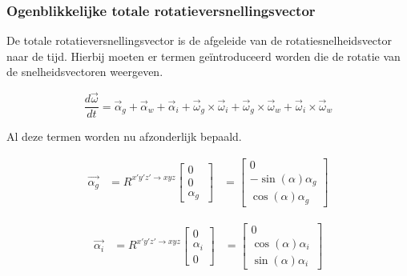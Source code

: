 \subsubsection{Ogenblikkelijke totale rotatieversnellingsvector}
De totale rotatieversnellingsvector is de afgeleide van de rotatiesnelheidsvector naar de tijd. Hierbij moeten er termen ge\"introduceerd worden die de rotatie van de snelheidsvectoren weergeven.

\begin{equation*}
\frac{d\overrightarrow{\omega}}{dt}=\overrightarrow{\alpha}_{g}+\overrightarrow{\alpha}_{w}+\overrightarrow{\alpha}_{i}+\overrightarrow{\omega}_{g}\times\overrightarrow{\omega}_{i}+\overrightarrow{\omega}_{g}\times\overrightarrow{\omega}_{w}+\overrightarrow{\omega}_{i}\times\overrightarrow{\omega}_{w}
\end{equation*}

Al deze termen worden nu afzonderlijk bepaald.

\begin{equation*}
\begin{split}
\overrightarrow{\alpha_{g}}&=R^{x'y'z' \rightarrow xyz}
	\begin{bmatrix}
	0\\
	0\\
	\alpha_{g}\
	\end{bmatrix}
	&=\begin{bmatrix}
	0\\
	-\sin(\alpha)\alpha_{g}\\
	\cos(\alpha)\alpha_{g}\
	\end{bmatrix}
\end{split}
\end{equation*}

\begin{equation*}
\begin{split}
\overrightarrow{\alpha_{i}}&=R^{x'y'z' \rightarrow xyz}
	\begin{bmatrix}
	0\\
	\alpha_{i}\\
	0\
	\end{bmatrix}
	&=\begin{bmatrix}
	0\\
	\cos(\alpha)\alpha_{i}\\
	\sin(\alpha)\alpha_{i}\
	\end{bmatrix}
\end{split}
\end{equation*}

